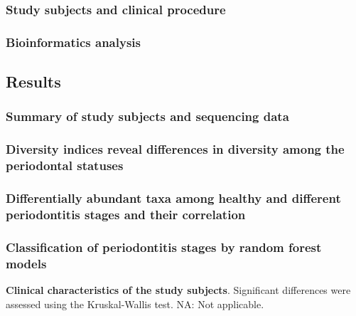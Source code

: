\documentclass[11pt, a4paper, onecolumn, oneside]{report}
\begin{document}
            \subsubsection{Study subjects and clinical procedure}
            \subsubsection{Bioinformatics analysis}
        \newpage

        \subsection{Results}
            \subsubsection{Summary of study subjects and sequencing data}
            \subsubsection{Diversity indices reveal differences in diversity among the periodontal statuses}
            \subsubsection{Differentially abundant taxa among healthy and different periodontitis stages and their correlation}
            \subsubsection{Classification of periodontitis stages by random forest models}

            \begin{table}[p]
                \centering

                \caption[Clinical characteristics of the study subjects]{\textbf{Clinical characteristics of the study subjects}. Significant differences were assessed using the Kruskal-Wallis test. NA: Not applicable.}
                \label{tab:Periodontitis-clinical}
            \end{table}
            \clearpage
\end{document}
